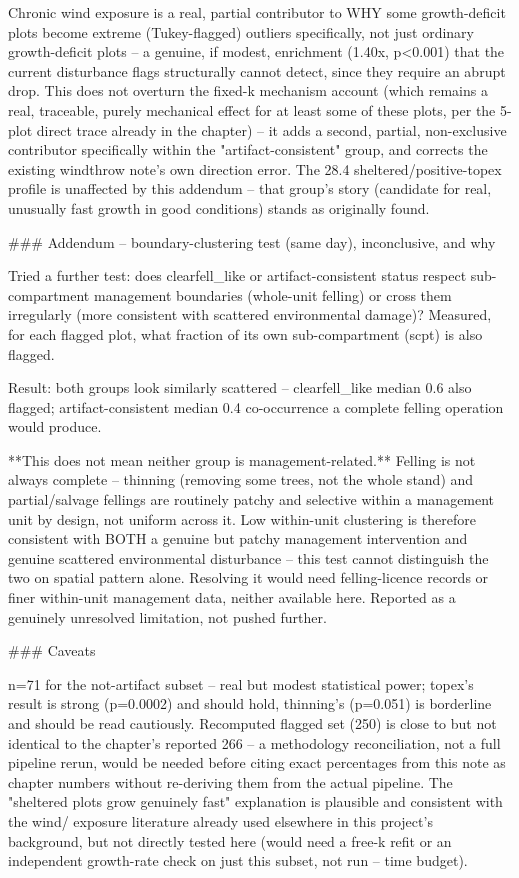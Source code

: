 Chronic wind exposure is a real, partial contributor to WHY some growth-deficit plots become
extreme (Tukey-flagged) outliers specifically, not just ordinary growth-deficit plots -- a
genuine, if modest, enrichment (1.40x, p<0.001) that the current disturbance flags structurally
cannot detect, since they require an abrupt drop. This does not overturn the fixed-k mechanism
account (which remains a real, traceable, purely mechanical effect for at least some of these
plots, per the 5-plot direct trace already in the chapter) -- it adds a second, partial,
non-exclusive contributor specifically within the "artifact-consistent" group, and corrects the
existing windthrow note's own direction error. The 28.4%
sheltered/positive-topex profile is unaffected by this addendum -- that group's story (candidate
for real, unusually fast growth in good conditions) stands as originally found.

### Addendum -- boundary-clustering test (same day), inconclusive, and why

Tried a further test: does clearfell_like or artifact-consistent status respect sub-compartment
management boundaries (whole-unit felling) or cross them irregularly (more consistent with
scattered environmental damage)? Measured, for each flagged plot, what fraction of its own
sub-compartment (scpt) is also flagged.

Result: both groups look similarly scattered -- clearfell_like median 0.6%
also flagged; artifact-consistent median 0.4%
co-occurrence a complete felling operation would produce.

**This does not mean neither group is management-related.** Felling is not always complete --
thinning (removing some trees, not the whole stand) and partial/salvage fellings are routinely
patchy and selective within a management unit by design, not uniform across it. Low within-unit
clustering is therefore consistent with BOTH a genuine but patchy management intervention and
genuine scattered environmental disturbance -- this test cannot distinguish the two on spatial
pattern alone. Resolving it would need felling-licence records or finer within-unit management
data, neither available here. Reported as a genuinely unresolved limitation, not pushed further.

### Caveats

n=71 for the not-artifact subset -- real but modest statistical power; topex's result is strong
(p=0.0002) and should hold, thinning's (p=0.051) is borderline and should be read cautiously.
Recomputed flagged set (250) is close to but not identical to the chapter's reported 266 -- a
methodology reconciliation, not a full pipeline rerun, would be needed before citing exact
percentages from this note as chapter numbers without re-deriving them from the actual pipeline.
The "sheltered plots grow genuinely fast" explanation is plausible and consistent with the wind/
exposure literature already used elsewhere in this project's background, but not directly tested
here (would need a free-k refit or an independent growth-rate check on just this subset, not run
-- time budget).
